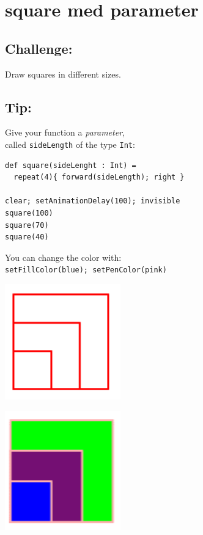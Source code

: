 \chapter{square med parameter}
\begin{multicols}{2}
\section*{\color{BrickRed}Challenge:}
Draw squares in different sizes.
\section*{\color{OliveGreen}Tip:}
Give your function a {\it parameter},\\
called \lstinline{sideLength} of the type \lstinline{Int}:

\begin{lstlisting}[basicstyle={\ttfamily\fontsize{16}{19}\selectfont},numbers=none]
def square(sideLenght : Int) = 
  repeat(4){ forward(sideLength); right }

clear; setAnimationDelay(100); invisible
square(100) 
square(70)
square(40)
\end{lstlisting}
        
You can change the color with:\\
\lstinline{setFillColor(blue); setPenColor(pink)}


\columnbreak


\begin{center}
\includegraphics[width=5.0cm]{../img/square-param.png}
\end{center}

\begin{center}
\includegraphics[width=5.0cm]{../img/square-param-color.png}
\end{center}

\end{multicols}

